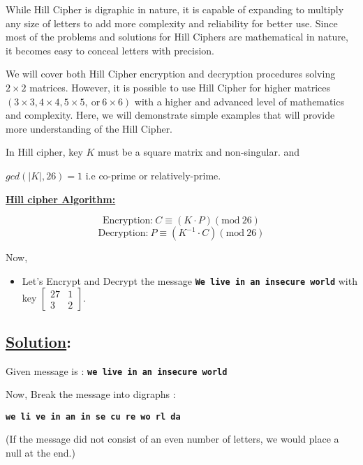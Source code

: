 \documentclass[a4paper,12pt]{article}
\begin{document}
   While Hill Cipher is digraphic in nature, it is capable of expanding to multiply any size of letters to add more complexity and reliability for better use. Since most of the problems and solutions for Hill Ciphers are mathematical in nature, it becomes easy to conceal letters with precision.

   We will cover both Hill Cipher encryption and decryption procedures solving $2 \times 2$ matrices. However, it is possible to use Hill Cipher for higher matrices $(3\times 3, 4\times 4, 5 \times 5,\  \mbox{or}\  6 \times 6)$ with a higher and advanced level of mathematics and complexity. Here, we will demonstrate simple examples that will provide more understanding of the Hill Cipher.
   \vspace*{0.5cm}

   In Hill cipher, key $K$ must be  a square matrix and non-singular. and

   $gcd(|K|,26) = 1$ i.e co-prime or relatively-prime.

   \vspace*{0.5cm}

   \underline{{{\bf Hill cipher Algorithm:}}}

   $$\mbox{Encryption:}\ C \equiv (K\cdot P)(\mbox{mod}\ 26)$$
   $$\mbox{Decryption:}\ P \equiv (K^{-1}\cdot C)(\mbox{mod}\ 26)$$

   Now,

   \begin{itemize}
    \item Let's Encrypt and Decrypt the message {\bf\texttt{We live in an insecure world}} with key $\begin{bmatrix}
        27 & 1\\ 
        3 & 2
        \end{bmatrix}$.
   \end{itemize}

    \subsection*{\underline{Solution}:}

    Given message is :
    {\bf \texttt{we live in an insecure world}}

    Now, Break the message into digraphs :
    \begin{center}
        {\bf \texttt{we li ve in an in se cu re wo rl da}}
    \end{center}

    (If the message did not consist of an even number of letters, we would place a null at the end.)
\end{document}
